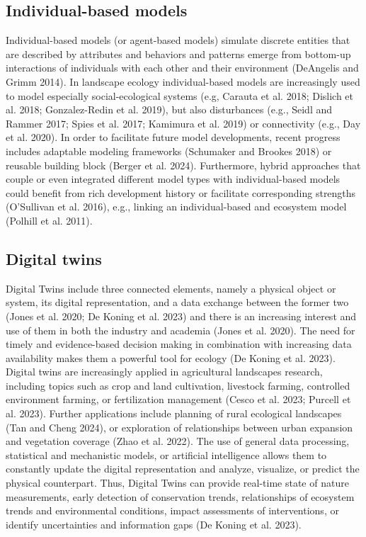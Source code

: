 \documentclass[
  10pt,
  a4paperpaper,
]{article}
\begin{document}
\subsection{Individual-based models}\label{individual-based-models}

Individual-based models (or agent-based models) simulate discrete
entities that are described by attributes and behaviors and patterns
emerge from bottom-up interactions of individuals with each other and
their environment (DeAngelis and Grimm 2014). In landscape ecology
individual-based models are increasingly used to model especially
social-ecological systems (e.g, Carauta et al. 2018; Dislich et al.
2018; Gonzalez-Redin et al. 2019), but also disturbances (e.g., Seidl
and Rammer 2017; Spies et al. 2017; Kamimura et al. 2019) or
connectivity (e.g., Day et al. 2020). In order to facilitate future
model developments, recent progress includes adaptable modeling
frameworks (Schumaker and Brookes 2018) or reusable building block
(Berger et al. 2024). Furthermore, hybrid approaches that couple or even
integrated different model types with individual-based models could
benefit from rich development history or facilitate corresponding
strengths (O'Sullivan et al. 2016), e.g., linking an individual-based
and ecosystem model (Polhill et al. 2011).

\subsection{Digital twins}\label{digital-twins}

Digital Twins include three connected elements, namely a physical object
or system, its digital representation, and a data exchange between the
former two (Jones et al. 2020; De Koning et al. 2023) and there is an
increasing interest and use of them in both the industry and academia
(Jones et al. 2020). The need for timely and evidence-based decision
making in combination with increasing data availability makes them a
powerful tool for ecology (De Koning et al. 2023). Digital twins are
increasingly applied in agricultural landscapes research, including
topics such as crop and land cultivation, livestock farming, controlled
environment farming, or fertilization management (Cesco et al. 2023;
Purcell et al. 2023). Further applications include planning of rural
ecological landscapes (Tan and Cheng 2024), or exploration of
relationships between urban expansion and vegetation coverage (Zhao et
al. 2022). The use of general data processing, statistical and
mechanistic models, or artificial intelligence allows them to constantly
update the digital representation and analyze, visualize, or predict the
physical counterpart. Thus, Digital Twins can provide real-time state of
nature measurements, early detection of conservation trends,
relationships of ecosystem trends and environmental conditions, impact
assessments of interventions, or identify uncertainties and information
gaps (De Koning et al. 2023).
\end{document}
